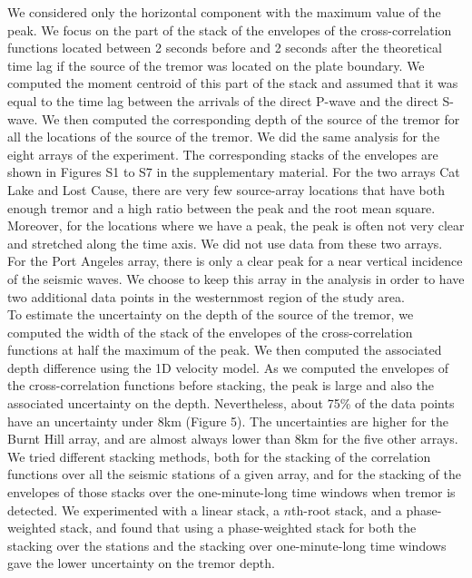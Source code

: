 \documentclass[draft]{agujournal2019}
\begin{document}
We considered only the horizontal component with the maximum value of the peak. We focus on the part of the stack of the envelopes of the cross-correlation functions located between 2 seconds before and 2 seconds after the theoretical time lag if the source of the tremor was located on the plate boundary. We computed the moment centroid of this part of the stack and assumed that it was equal to the time lag between the arrivals of the direct P-wave and the direct S-wave. We then computed the corresponding depth of the source of the tremor for all the locations of the source of the tremor. We did the same analysis for the eight arrays of the experiment. The corresponding stacks of the envelopes are shown in Figures S1 to S7 in the supplementary material. For the two arrays Cat Lake and Lost Cause, there are very few source-array locations that have both enough tremor and a high ratio between the peak and the root mean square. Moreover, for the locations where we have a peak, the peak is often not very clear and stretched along the time axis. We did not use data from these two arrays. For the Port Angeles array, there is only a clear peak for a near vertical incidence of the seismic waves. We choose to keep this array in the analysis in order to have two additional data points in the westernmost region of the study area. \\

To estimate the uncertainty on the depth of the source of the tremor, we computed the width of the stack of the envelopes of the cross-correlation functions at half the maximum of the peak. We then computed the associated depth difference using the 1D velocity model. As we computed the envelopes of the cross-correlation functions before stacking, the peak is large and also the associated uncertainty on the depth. Nevertheless, about 75\% of the data points have an uncertainty under 8km (Figure 5). The uncertainties are higher for the Burnt Hill array, and are almost always lower than 8km for the five other arrays. We tried different stacking methods, both for the stacking of the correlation functions over all the seismic stations of a given array, and for the stacking of the envelopes of those stacks over the one-minute-long time windows when tremor is detected. We experimented with a linear stack, a $n$th-root stack, and a phase-weighted stack, and found that using a phase-weighted stack for both the stacking over the stations and the stacking over one-minute-long time windows gave the lower uncertainty on the tremor depth. \\
\end{document}
